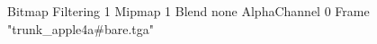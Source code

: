 {Bitmap
	{Filtering 1}
	{Mipmap 1}
	{Blend none}
	{AlphaChannel 0}
	{Frame "trunk_apple4a#bare.tga"}
}
